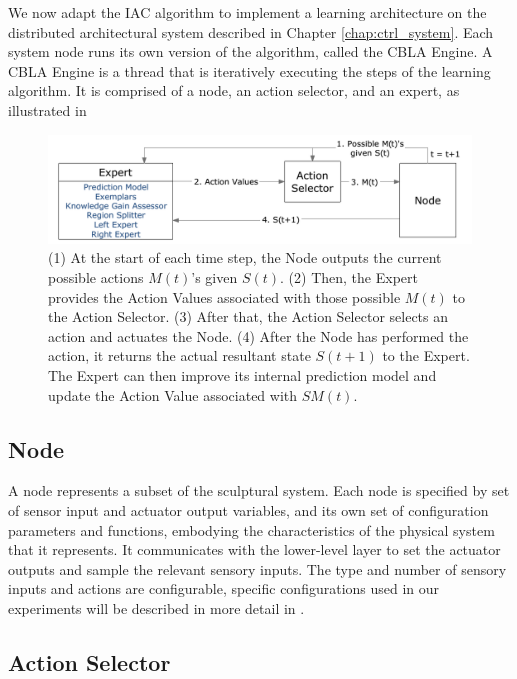 We now adapt the IAC algorithm \cite{Oudeyer2007} to implement a learning architecture on the distributed architectural system described in Chapter \ref{chap:ctrl_system}. Each system node runs its own version of the algorithm, called the CBLA Engine. A CBLA Engine is a thread that is iteratively executing the steps of the learning algorithm. It is comprised of a node, an action selector, and an expert, as illustrated in  

\begin{figure}[htbp]
	\centering
	\includegraphics[width=1.0 \textwidth]{"fig/cbla/Block Diagram CBLA"}
	\caption[Block diagram of the Curiosity Based Learning Algorithm]{(1) At the start of each time step, the Node outputs the current possible actions $M(t)$'s given $S(t)$. (2) Then, the Expert provides the Action Values associated with those possible $M(t)$ to the Action Selector. (3) After that, the Action Selector selects an action and actuates the Node. (4) After the Node has performed the action, it returns the actual resultant state $S(t+1)$ to the Expert. The Expert can then improve its internal prediction model and update the Action Value associated with $SM(t)$. }
	\label{fig:Block Diagram CBLA}
\end{figure}


\FloatBarrier
\subsection{Node}
A node represents a subset of the sculptural system. Each node is specified by set of sensor input and actuator output variables, and its own set of configuration parameters and functions, embodying the characteristics of the physical system that it represents. It communicates with the lower-level layer to set the actuator outputs and sample the relevant sensory inputs.  The type and number of sensory inputs and actions are configurable, specific configurations used in our experiments will be described in more detail in .

\subsection{Action Selector}

